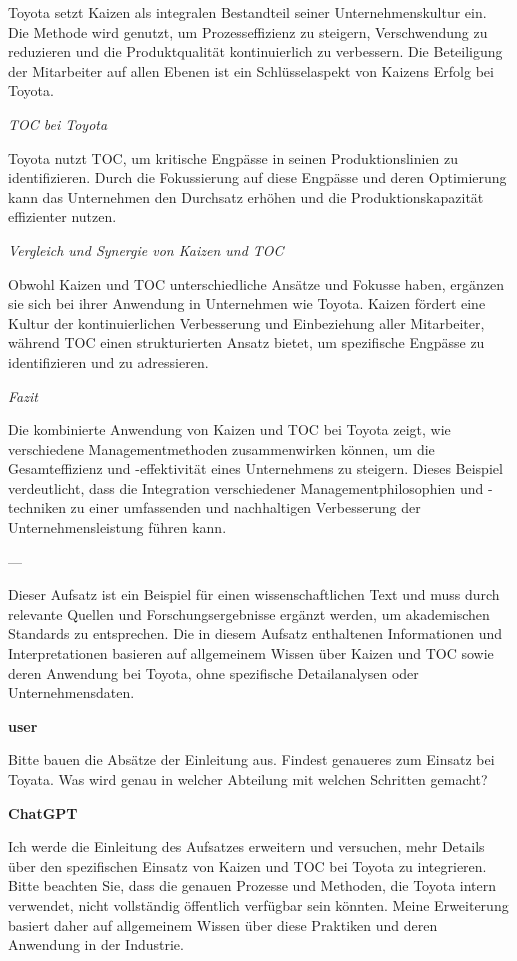 Toyota setzt Kaizen als integralen Bestandteil seiner Unternehmenskultur ein. Die Methode wird genutzt, um Prozesseffizienz zu steigern, Verschwendung zu reduzieren und die Produktqualität kontinuierlich zu verbessern. Die Beteiligung der Mitarbeiter auf allen Ebenen ist ein Schlüsselaspekt von Kaizens Erfolg bei Toyota.

\textit{TOC bei Toyota}

Toyota nutzt TOC, um kritische Engpässe in seinen Produktionslinien zu identifizieren. Durch die Fokussierung auf diese Engpässe und deren Optimierung kann das Unternehmen den Durchsatz erhöhen und die Produktionskapazität effizienter nutzen.

\textit{Vergleich und Synergie von Kaizen und TOC}

Obwohl Kaizen und TOC unterschiedliche Ansätze und Fokusse haben, ergänzen sie sich bei ihrer Anwendung in Unternehmen wie Toyota. Kaizen fördert eine Kultur der kontinuierlichen Verbesserung und Einbeziehung aller Mitarbeiter, während TOC einen strukturierten Ansatz bietet, um spezifische Engpässe zu identifizieren und zu adressieren.

\textit{Fazit}

Die kombinierte Anwendung von Kaizen und TOC bei Toyota zeigt, wie verschiedene Managementmethoden zusammenwirken können, um die Gesamteffizienz und -effektivität eines Unternehmens zu steigern. Dieses Beispiel verdeutlicht, dass die Integration verschiedener Managementphilosophien und -techniken zu einer umfassenden und nachhaltigen Verbesserung der Unternehmensleistung führen kann.

---

Dieser Aufsatz ist ein Beispiel für einen wissenschaftlichen Text und muss durch relevante Quellen und Forschungsergebnisse ergänzt werden, um akademischen Standards zu entsprechen. Die in diesem Aufsatz enthaltenen Informationen und Interpretationen basieren auf allgemeinem Wissen über Kaizen und TOC sowie deren Anwendung bei Toyota, ohne spezifische Detailanalysen oder Unternehmensdaten.

\textbf{user}

Bitte bauen die Absätze der Einleitung aus. Findest genaueres zum Einsatz bei Toyata. Was wird genau in welcher Abteilung mit welchen Schritten gemacht? 

\textbf{ChatGPT}

Ich werde die Einleitung des Aufsatzes erweitern und versuchen, mehr Details über den spezifischen Einsatz von Kaizen und TOC bei Toyota zu integrieren. Bitte beachten Sie, dass die genauen Prozesse und Methoden, die Toyota intern verwendet, nicht vollständig öffentlich verfügbar sein könnten. Meine Erweiterung basiert daher auf allgemeinem Wissen über diese Praktiken und deren Anwendung in der Industrie.

